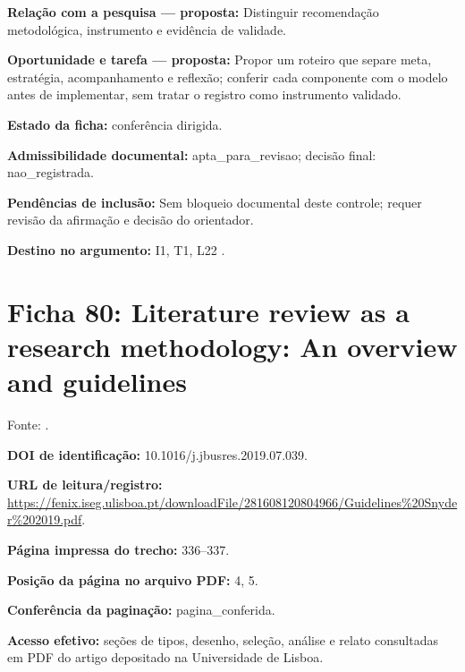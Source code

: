 \noindent\textbf{Relação com a pesquisa — proposta:} Distinguir recomendação metodológica, instrumento e evidência de validade.\par\medskip

\noindent\textbf{Oportunidade e tarefa — proposta:} Propor um roteiro que separe meta, estratégia, acompanhamento e reflexão; conferir cada componente com o modelo antes de implementar, sem tratar o registro como instrumento validado.\par\medskip

\noindent\textbf{Estado da ficha:} conferência dirigida.\par\medskip

\noindent\textbf{Admissibilidade documental:} apta\_para\_revisao; decisão final: nao\_registrada.\par\medskip

\noindent\textbf{Pendências de inclusão:} Sem bloqueio documental deste controle; requer revisão da afirmação e decisão do orientador.\par\medskip

\noindent\textbf{Destino no argumento:} I1, T1, L22 .

\clearpage\section*{Ficha 80: Literature review as a research methodology: An overview and guidelines}

Fonte: \citet[p. 336–337]{SU11}.

\noindent\textbf{DOI de identificação:} 10.1016/j.jbusres.2019.07.039.\par\medskip

\noindent\textbf{URL de leitura/registro:} \url{https://fenix.iseg.ulisboa.pt/downloadFile/281608120804966/Guidelines%20Snyder%202019.pdf}.\par\medskip

\noindent\textbf{Página impressa do trecho:} 336–337.\par\medskip

\noindent\textbf{Posição da página no arquivo PDF:} 4, 5.\par\medskip

\noindent\textbf{Conferência da paginação:} pagina\_conferida.\par\medskip

\noindent\textbf{Acesso efetivo:} seções de tipos, desenho, seleção, análise e relato consultadas em PDF do artigo depositado na Universidade de Lisboa.\par\medskip

